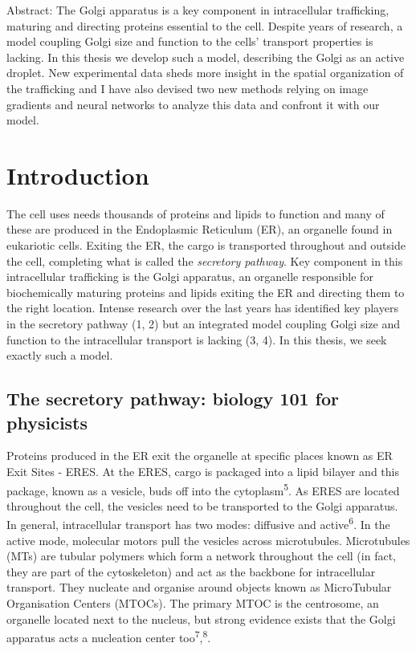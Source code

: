 \documentclass[12pt,a4paper,]{Dissertate}
\begin{document}
Abstract: The Golgi apparatus is a key component in intracellular
trafficking, maturing and directing proteins essential to the cell.
Despite years of research, a model coupling Golgi size and function to
the cells' transport properties is lacking. In this thesis we develop
such a model, describing the Golgi as an active droplet. New
experimental data sheds more insight in the spatial organization of the
trafficking and I have also devised two new methods relying on image
gradients and neural networks to analyze this data and confront it with
our model.

\setcounter{page}{1}
\newpage
{}

\tableofcontents

\newpage

\hypertarget{introduction}{%
\chapter{Introduction}\label{introduction}}

The cell uses needs thousands of proteins and lipids to function and
many of these are produced in the Endoplasmic Reticulum (ER), an
organelle found in eukariotic cells. Exiting the ER, the cargo is
transported throughout and outside the cell, completing what is called
the \emph{secretory pathway}. Key component in this intracellular
trafficking is the Golgi apparatus, an organelle responsible for
biochemically maturing proteins and lipids exiting the ER and directing
them to the right location. Intense research over the last years has
identified key players in the secretory pathway (1, 2) but an integrated
model coupling Golgi size and function to the intracellular transport is
lacking (3, 4). In this thesis, we seek exactly such a model.

\hypertarget{the-secretory-pathway-biology-101-for-physicists}{%
\section{The secretory pathway: biology 101 for
physicists}\label{the-secretory-pathway-biology-101-for-physicists}}

Proteins produced in the ER exit the organelle at specific places known
as ER Exit Sites - ERES. At the ERES, cargo is packaged into a lipid
bilayer and this package, known as a vesicle, buds off into the
cytoplasm\textsuperscript{5}. As ERES are located throughout the cell,
the vesicles need to be transported to the Golgi apparatus. In general,
intracellular transport has two modes: diffusive and
active\textsuperscript{6}. In the active mode, molecular motors pull the
vesicles across microtubules. Microtubules (MTs) are tubular polymers
which form a network throughout the cell (in fact, they are part of the
cytoskeleton) and act as the backbone for intracellular transport. They
nucleate and organise around objects known as MicroTubular Organisation
Centers (MTOCs). The primary MTOC is the centrosome, an organelle
located next to the nucleus, but strong evidence exists that the Golgi
apparatus acts a nucleation center
too\textsuperscript{7},\textsuperscript{8}.
\end{document}
